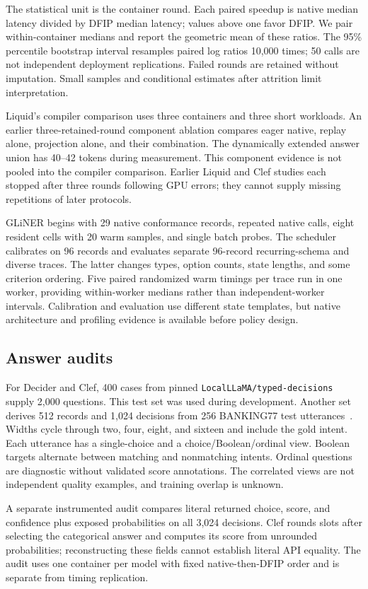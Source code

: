 \documentclass[10pt,twocolumn]{article}
\begin{document}
The statistical unit is the container round. Each paired speedup is native median latency divided by DFIP median latency; values above one favor DFIP. We pair within-container medians and report the geometric mean of these ratios. The 95\% percentile bootstrap interval resamples paired log ratios 10,000 times; 50 calls are not independent deployment replications. Failed rounds are retained without imputation. Small samples and conditional estimates after attrition limit interpretation.

Liquid's compiler comparison uses three containers and three short workloads. An earlier three-retained-round component ablation compares eager native, replay alone, projection alone, and their combination. The dynamically extended answer union has 40--42 tokens during measurement. This component evidence is not pooled into the compiler comparison. Earlier Liquid and Clef studies each stopped after three rounds following GPU errors; they cannot supply missing repetitions of later protocols.

GLiNER begins with 29 native conformance records, repeated native calls, eight resident cells with 20 warm samples, and single batch probes. The scheduler calibrates on 96 records and evaluates separate 96-record recurring-schema and diverse traces. The latter changes types, option counts, state lengths, and some criterion ordering. Five paired randomized warm timings per trace run in one worker, providing within-worker medians rather than independent-worker intervals. Calibration and evaluation use different state templates, but native architecture and profiling evidence is available before policy design.

\subsection{Answer audits}
For Decider and Clef, 400 cases from pinned \texttt{LocalLLaMA/typed-decisions} supply 2,000 questions. This test set was used during development. Another set derives 512 records and 1,024 decisions from 256 BANKING77 test utterances~\citep{banking}. Widths cycle through two, four, eight, and sixteen and include the gold intent. Each utterance has a single-choice and a choice/Boolean/ordinal view. Boolean targets alternate between matching and nonmatching intents. Ordinal questions are diagnostic without validated score annotations. The correlated views are not independent quality examples, and training overlap is unknown.

A separate instrumented audit compares literal returned choice, score, and confidence plus exposed probabilities on all 3,024 decisions. Clef rounds slots after selecting the categorical answer and computes its score from unrounded probabilities; reconstructing these fields cannot establish literal API equality. The audit uses one container per model with fixed native-then-DFIP order and is separate from timing replication.
\end{document}
